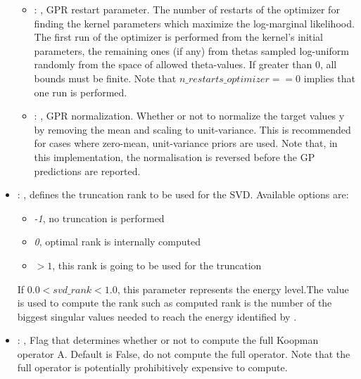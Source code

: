 \begin{itemize}
\begin{itemize}
        \item {}: , 
          GPR restart parameter. The number of restarts of the optimizer for finding the
          kernel parameters which maximize the log-marginal likelihood. The first run of the
          optimizer                                                  is performed from the kernel’s
          initial parameters, the remaining ones (if any) from thetas
          sampled log-uniform randomly from the space of allowed theta-values. If greater than 0,
          all bounds must be finite. Note that $n\_restarts\_optimizer == 0$ implies that one run is
          performed.

        \item {}: , 
          GPR normalization. Whether or not to normalize the target values y by removing the mean
          and scaling                                                  to unit-variance. This is
          recommended for cases where zero-mean, unit-variance priors are used.
          Note that, in this implementation, the normalisation is reversed before the GP predictions
          are reported.
      \end{itemize}

    \item {}: , 
      defines the truncation rank to be used for the SVD.
      Available options are:                                                  \begin{itemize}
      \item \textit{-1}, no truncation is performed
      \item \textit{0}, optimal rank is internally computed
      \item \textit{$>1$}, this rank is going to be used for the truncation
      \end{itemize}                                                  If $0.0 < svd\_rank < 1.0$, this
      parameter represents the energy level.The value is used to compute the rank such
      as computed rank is the number of the biggest singular values needed to reach the energy
      identified by                                                    .

    \item {}: , 
      Flag that determines whether or not to compute the full Koopman operator A.
      Default is False, do not compute the full operator. Note that the full operator
      is potentially prohibitively expensive to compute.


\end{itemize}
